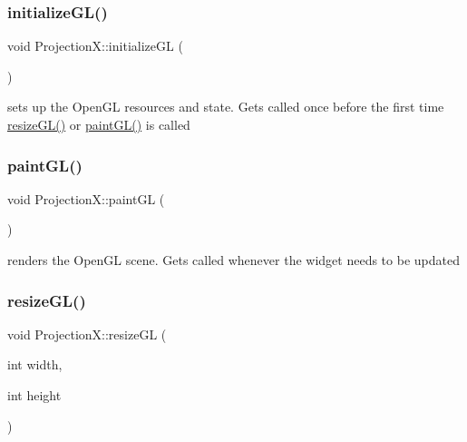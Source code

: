 \subsubsection{\texorpdfstring{initialize\+G\+L()}{initializeGL()}}
{\footnotesize\ttfamily void Projection\+X\+::initialize\+GL (\begin{DoxyParamCaption}{ }\end{DoxyParamCaption})\hspace{0.3cm}{\ttfamily [protected]}}



sets up the Open\+GL resources and state. Gets called once before the first time \mbox{\hyperlink{class_projection_x_a7eb1ba9a4266f65982357e53142bc693}{resize\+G\+L()}} or \mbox{\hyperlink{class_projection_x_a4fff0844542e49a68b0288c85703b1c4}{paint\+G\+L()}} is called 

\mbox{\label{class_projection_x_a4fff0844542e49a68b0288c85703b1c4}} 
\subsubsection{\texorpdfstring{paint\+G\+L()}{paintGL()}}
{\footnotesize\ttfamily void Projection\+X\+::paint\+GL (\begin{DoxyParamCaption}{ }\end{DoxyParamCaption})\hspace{0.3cm}{\ttfamily [protected]}}



renders the Open\+GL scene. Gets called whenever the widget needs to be updated 

\mbox{\label{class_projection_x_a7eb1ba9a4266f65982357e53142bc693}} 
\subsubsection{\texorpdfstring{resize\+G\+L()}{resizeGL()}}
{\footnotesize\ttfamily void Projection\+X\+::resize\+GL (\begin{DoxyParamCaption}\item[{int}]{width,  }\item[{int}]{height }\end{DoxyParamCaption})\hspace{0.3cm}{\ttfamily [protected]}}



